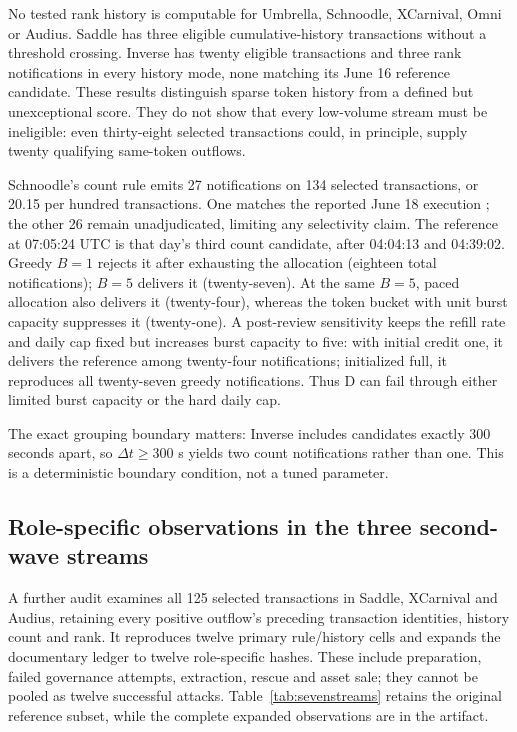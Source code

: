 \documentclass[preprint,12pt,authoryear]{elsarticle}
\begin{document}
No tested rank history is computable for Umbrella, Schnoodle, XCarnival, Omni or Audius. Saddle has three eligible cumulative-history transactions without a threshold crossing. Inverse has twenty eligible transactions and three rank notifications in every history mode, none matching its June 16 reference candidate. These results distinguish sparse token history from a defined but unexceptional score. They do not show that every low-volume stream must be ineligible: even thirty-eight selected transactions could, in principle, supply twenty qualifying same-token outflows.

Schnoodle's count rule emits 27 notifications on 134 selected transactions, or 20.15 per hundred transactions. One matches the reported June 18 execution \citep{Schnoodle2022Analysis}; the other 26 remain unadjudicated, limiting any selectivity claim. The reference at 07:05:24 UTC is that day's third count candidate, after 04:04:13 and 04:39:02. Greedy $B=1$ rejects it after exhausting the allocation (eighteen total notifications); $B=5$ delivers it (twenty-seven). At the same $B=5$, paced allocation also delivers it (twenty-four), whereas the token bucket with unit burst capacity suppresses it (twenty-one). A post-review sensitivity keeps the refill rate and daily cap fixed but increases burst capacity to five: with initial credit one, it delivers the reference among twenty-four notifications; initialized full, it reproduces all twenty-seven greedy notifications. Thus D can fail through either limited burst capacity or the hard daily cap.

The exact grouping boundary matters: Inverse includes candidates exactly 300 seconds apart, so $\Delta t\geq300$ s yields two count notifications rather than one. This is a deterministic boundary condition, not a tuned parameter.

\subsection{Role-specific observations in the three second-wave streams}\label{sec:threeroles}
A further audit examines all 125 selected transactions in Saddle, XCarnival and Audius, retaining every positive outflow's preceding transaction identities, history count and rank. It reproduces twelve primary rule/history cells and expands the documentary ledger to twelve role-specific hashes. These include preparation, failed governance attempts, extraction, rescue and asset sale; they cannot be pooled as twelve successful attacks. Table~\ref{tab:sevenstreams} retains the original reference subset, while the complete expanded observations are in the artifact.
\end{document}

